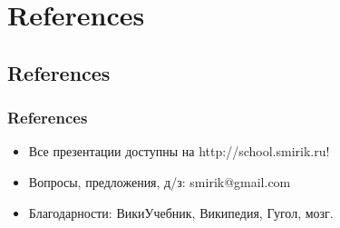 \documentclass[compress,red]{beamer}
\begin{document}
\section{References}
\subsection{References}
\begin{frame}[fragile]
  \frametitle{References}
  \begin{itemize}
    \item Все презентации доступны на http://school.smirik.ru!
    \item Вопросы, предложения, д/з: smirik@gmail.com
    \item Благодарности: ВикиУчебник, Википедия, Гугол, мозг.
  \end{itemize}
\end{frame}
\end{document}
